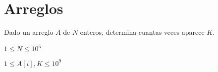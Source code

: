 \chapter*{Arreglos}


\problemtitle Dado un arreglo \(A\) de \(N\) enteros, determina cuantas veces aparece \(K\).
\begin{plimits}
	\item \(1\leq N \leq 10^5\)
	\item \(1\leq A[i], K \leq 10^9\)
\end{plimits}